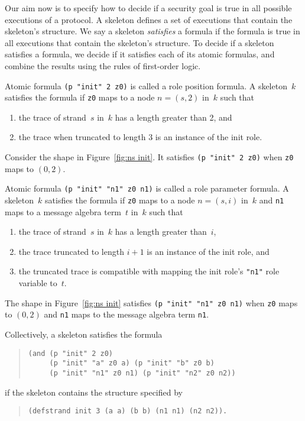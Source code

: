 \documentclass[12pt]{article}
\begin{document}
Our aim now is to specify how to decide if a security goal is true in
all possible executions of a protocol.  A skeleton defines a set of
executions that contain the skeleton's structure.  We say a skeleton
\emph{satisfies} a formula if the formula is true in all executions
that contain the skeleton's structure.  To decide if a skeleton
satisfies a formula, we decide if it satisfies each of its atomic
formulas, and combine the results using the rules of first-order
logic.

Atomic formula \texttt{(p "init" 2 z0)} is called a role position
formula.  A skeleton~$k$ satisfies the formula if \texttt{z0} maps to
a node $n=(s,2)$ in~$k$ such that
\begin{enumerate}
\item the trace of strand~$s$ in~$k$ has a length greater than 2, and
\item the trace when truncated to length 3 is an instance of the init
  role.
\end{enumerate}
Consider the shape in Figure~\ref{fig:ns init}.  It satisfies
\texttt{(p "init" 2 z0)} when \texttt{z0} maps to $(0,2)$.

Atomic formula \texttt{(p "init" "n1" z0 n1)} is called a role
parameter formula.  A skeleton~$k$ satisfies the formula if
\texttt{z0} maps to a node $n=(s,i)$ in~$k$ and \texttt{n1} maps to a
message algebra term~$t$ in~$k$ such that
\begin{enumerate}
\item the trace of strand~$s$ in~$k$ has a length greater than~$i$,
\item the trace truncated to length $i+1$ is an instance of the
  init role, and
\item the truncated trace is compatible with mapping the init role's
  \texttt{"n1"} role variable to~$t$.
\end{enumerate}
The shape in Figure~\ref{fig:ns init} satisfies \texttt{(p "init" "n1"
  z0 n1)} when \texttt{z0} maps to $(0,2)$ and \texttt{n1} maps to the
message algebra term \texttt{n1}.

Collectively, a skeleton satisfies the formula
\begin{quote}
\begin{verbatim}
(and (p "init" 2 z0)
     (p "init" "a" z0 a) (p "init" "b" z0 b)
     (p "init" "n1" z0 n1) (p "init" "n2" z0 n2))
\end{verbatim}
\end{quote}
if the skeleton contains the structure specified by
\begin{quote}
\begin{verbatim}
(defstrand init 3 (a a) (b b) (n1 n1) (n2 n2)).
\end{verbatim}
\end{quote}
\end{document}
